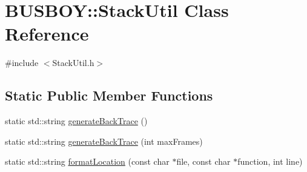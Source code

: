 \hypertarget{classBUSBOY_1_1StackUtil}{
\section{BUSBOY::StackUtil Class Reference}
\label{classBUSBOY_1_1StackUtil}
}


{\ttfamily \#include $<$StackUtil.h$>$}\subsection*{Static Public Member Functions}
\begin{DoxyCompactItemize}
\item 
static std::string \hyperlink{classBUSBOY_1_1StackUtil_a5dcea13d273130cf86eab7e9039bd22e}{generateBackTrace} ()
\item 
static std::string \hyperlink{classBUSBOY_1_1StackUtil_a634742686a4182fd639c1af761f756f3}{generateBackTrace} (int maxFrames)
\item 
static std::string \hyperlink{classBUSBOY_1_1StackUtil_ad3ca6fdc06fd82aa3b4cc5f1e28c3505}{formatLocation} (const char $\ast$file, const char $\ast$function, int line)
\end{DoxyCompactItemize}


